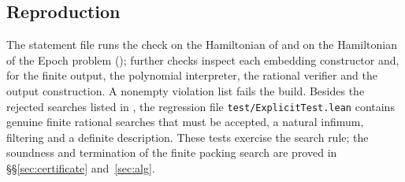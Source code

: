 \subsection{Reproduction}\label{sec:xpl-searches}

The statement file runs the check on the Hamiltonian of  and on the Hamiltonian of the Epoch
problem (); further checks inspect each embedding constructor and, for the finite
output, the polynomial interpreter, the rational verifier and the output construction. A nonempty violation list fails
the build. Besides the rejected searches listed in , the regression file \texttt{test/ExplicitTest.lean}
contains genuine finite rational searches that must be accepted, a natural infimum, filtering and a definite
description. These tests exercise the search rule; the soundness and termination of the finite packing search are
proved in \S\S\ref{sec:certificate} and~\ref{sec:alg}.
